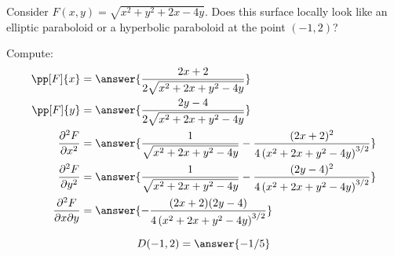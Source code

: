 \documentclass{ximera}
\begin{document}
\begin{question}
  Consider $F(x,y) = \sqrt{x^2+y^2+2x-4y}$. Does this surface locally look like
  an elliptic paraboloid or a hyperbolic paraboloid at the point
  $(-1,2)$?
  \begin{prompt}
    Compute:
    \begin{align*}
      \pp[F]{x} &= \answer{\frac{2 x+2}{2 \sqrt{x^2+2 x+y^2-4 y}}}\\
      \pp[F]{y} &= \answer{\frac{2 y-4}{2 \sqrt{x^2+2 x+y^2-4 y}}}\\
      \frac{\partial^2F}{\partial x^2} &= \answer{\frac{1}{\sqrt{x^2+2 x+y^2-4 y}}-\frac{(2 x+2)^2}{4 \left(x^2+2 x+y^2-4 y\right)^{3/2}}}\\
      \frac{\partial^2F}{\partial y^2} &= \answer{\frac{1}{\sqrt{x^2+2 x+y^2-4 y}}-\frac{(2 y-4)^2}{4 \left(x^2+2 x+y^2-4 y\right)^{3/2}}}\\
      \frac{\partial^2F}{\partial x\partial y} &= \answer{-\frac{(2 x+2) (2 y-4)}{4 \left(x^2+2 x+y^2-4 y\right)^{3/2}}}\\
    \end{align*}
    \begin{question}
      \[
      D(-1,2) = \answer{-1/5}
      \]
      \begin{question}
        \begin{multipleChoice}
        \end{multipleChoice}
      \end{question}
    \end{question}
  \end{prompt}
\end{question}
\end{document}
